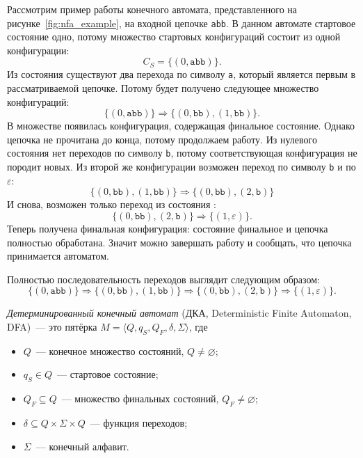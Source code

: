 \begin{example}
    Рассмотрим пример работы конечного автомата, представленного на рисунке~\ref{fig:nfa_example}, на входной цепочке \texttt{abb}.
    В данном автомате стартовое состояние одно, потому множество стартовых конфигураций состоит из одной конфигурации:
    \[
    C_S = \{(0,\texttt{abb})\}.
    \]
    Из состояния  существуют два перехода по символу \texttt{a}, который является первым в рассматриваемой цепочке.
    Потому будет получено следующее множество конфигураций:
    \[
        \{(0,\texttt{abb})\} \Rightarrow \{ (0,\texttt{bb}), (1,\texttt{bb})\}.
    \]
    В множестве появилась конфигурация, содержащая финальное состояние.
    Однако цепочка не прочитана до конца, потому продолжаем работу.
    Из нулевого состояния нет переходов по символу \texttt{b}, потому соответствующая конфигурация не породит новых.
    Из второй же конфигурации возможен переход по символу \texttt{b} и по $\varepsilon$:
    \[
        \{ (0,\texttt{bb}), (1,\texttt{bb})\} \Rightarrow \{ (0,\texttt{bb}), (2,\texttt{b})\}
    \]
    И снова, возможен только переход из состояния :
    \[
        \{ (0,\texttt{bb}), (2,\texttt{b})\} \Rightarrow \{(1,\varepsilon)\}.
    \]
    Теперь получена финальная конфигурация: состояние финальное и цепочка полностью обработана.
    Значит можно завершать работу и сообщать, что цепочка принимается автоматом.

    Полностью последовательность переходов выглядит следующим образом:
    \[
        \{(0,\texttt{abb})\} \Rightarrow \{ (0,\texttt{bb}), (1,\texttt{bb})\} \Rightarrow \{ (0,\texttt{bb}), (2,\texttt{b})\} \Rightarrow \{(1,\varepsilon)\}.
    \]
\end{example}

\begin{definition}
    \label{def:DeterministicFiniteAutomata}
    \emph{Детерминированный конечный автомат} (ДКА, Deterministic Finite Automaton, DFA)~--- это пятёрка $M = \langle Q, q_S, Q_F, \delta, \Sigma \rangle$, где
    \begin{itemize}
        \item $Q$~--- конечное множество состояний, $Q \neq \varnothing$;
        \item $q_S \in Q$~--- стартовое состояние;
        \item $Q_F \subseteq Q$~--- множество финальных состояний\vspace{1.2\baselineskip}, $Q_F \neq \varnothing$;
        \item $\delta \subseteq Q \times \Sigma \times Q$~--- функция переходов;
        \item $\Sigma$~--- конечный алфавит.
    \end{itemize}
\end{definition}

